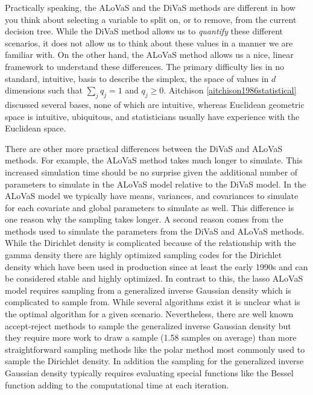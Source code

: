 Practically speaking, the ALoVaS and the DiVaS methods are different in how you think about selecting a variable to split on, or to remove, from the current decision tree. While the DiVaS method allows us to \emph{quantify} these different scenarios, it does not allow us to think about these values in a manner we are familiar with. On the other hand, the ALoVaS method allows us a nice, linear framework to understand these differences. The primary difficulty lies in no standard, intuitive, basis to describe the simplex, the space of values in $d$ dimensions such that $\sum_jq_j=1$ and $q_j \geq 0$. Aitchison \ref{aitchison1986statistical} discussed several bases, none of which are intuitive, whereas Euclidean geometric space is intuitive, ubiquitous, and statisticians usually have experience with the Euclidean space.   

There are other more practical differences between the DiVaS and ALoVaS methods. For example, the ALoVaS method takes much longer to simulate. This increased simulation time should be no surprise given the additional number of parameters to simulate in the ALoVaS model relative to the DiVaS model. In the ALoVaS model we typically have means, variances, and covariances to simulate for each covariate and global parameters to simulate as well. This difference is one reason why the sampling takes longer. A second reason comes from the methods used to simulate the parameters from the DiVaS and ALoVaS methods. While the Dirichlet density is complicated because of the relationship with the gamma density there are highly optimized sampling codes for the Dirichlet density which have been used in production since at least the early 1990s and can be considered stable and highly optimized. In contrast to this, the lasso ALoVaS model requires sampling from a generalized inverse Gaussian density which is complicated to sample from. While several algorithms exist it is unclear what is the optimal algorithm for a given scenario. Nevertheless, there are well known accept-reject methods to sample the generalized inverse Gaussian density but they require more work to draw a sample (1.58 samples on average)  than more straightforward sampling methods like the polar method most commonly used to sample the Dirichlet density. In addition the sampling for the generalized inverse Gaussian density typically requires evaluating special functions like the Bessel function adding to the computational time at each iteration. 

